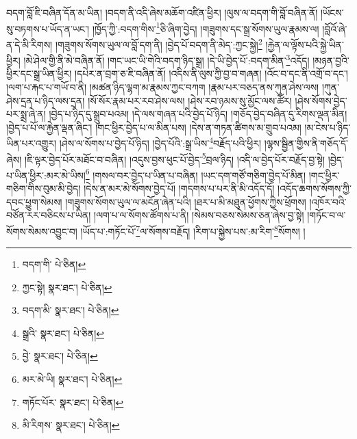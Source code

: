 བདག་བློ་ཇི་བཞིན་དོན་མ་ཡིན། །བདག་ནི་འདི་ཞེས་མཆོག་འཛིན་ཕྱིར། །ལུས་ལ་བདག་གི་བློ་བཞིན་ནོ། །ཡོངས་སུ་བཏགས་པ་ཡོད་ན་ཡང་། །ཁྱོད་ཀྱི་:བདག་གིས་\footnote{བདག་གི་  པེ་ཅིན། }ཅི་ཞིག་བྱེད། །གཟུགས་དང་སྒྲ་སོགས་ཡུལ་རྣམས་ལ། །བློའོ་ཞེ་ན་དེ་མི་རིགས། །གཟུགས་སོགས་ཡུལ་ལ་བློ་དག་ནི། །བྱེད་པོ་བདག་ནི་མེད་:ཀྱང་སྐྱེ།\footnote{ཀྱང་སྟེ།  སྣར་ཐང་།  པེ་ཅིན། } །རྐྱེན་ལ་ལྟོས་པའི་སྐྱེ་ཡིན་ཕྱིར། །མེ་ཤེལ་གྱི་ནི་མེ་བཞིན་ནོ། །གང་ཡང་ཡི་གེའི་བདག་ཉིད་སྒྲ། །དེ་ཡི་བྱེད་པོ་:བདག་མིན་\footnote{བདག་མི་  སྣར་ཐང་།  པེ་ཅིན། }འདོད། །མཉན་བྱའི་ཕྱིར་དང་སྒྲ་ཡིན་ཕྱིར། །དཔེར་ན་བྲག་ཅ་ཇི་བཞིན་ནོ། །འདིས་ནི་ལུས་ཀྱི་བྱ་བ་གཞན། །འོང་བ་དང་ནི་འགྲོ་བ་དང་། །ལག་པ་རྐང་པ་གཡོ་བ་ནི། །མཚན་ཉིད་ལྷག་མ་རྣམས་ཀྱང་བཀག །རྣམ་པར་བཅད་ནས་ཀུན་ཤེས་ལས། །ཀུན་ཤེས་དྲན་པ་ཉིད་ལས་དྲན། །སོ་སོར་རྣམ་པར་རབ་ཤེས་ལས། །ཤེས་རབ་ཉམས་སུ་མྱོང་ལས་ཚོར། །ཤེས་སོགས་བྱེད་པར་སྨྲ་ཞེ་ན། །བྱེད་པ་ཉིད་དུ་སྒྲུབ་པའམ། །དེ་ལས་གཞན་པའི་བྱེད་པོ་ཉིད། །གཅོད་བྱེད་བཞིན་དུ་རིགས་ལྡན་མིན། །བྱེད་པ་པོ་ལ་རྐྱེན་ལྡན་ཞིང་། །གང་ཕྱིར་བྱེད་པ་ལ་མིན་པས། །དེས་ན་གཏན་ཚིགས་མ་གྲུབ་པའམ། །མ་ངེས་པ་ཉིད་ཡིན་པར་འགྱུར། །ཤེས་ལ་སོགས་པ་བྱེད་པོ་ཉིད། །བྱེད་པོའི་:སྒྲ་ཡིས་\footnote{སྒྲའི་  སྣར་ཐང་།  པེ་ཅིན། }བརྗོད་པའི་ཕྱིར། །ལྷས་སྦྱིན་གྱིས་ནི་གཅོད་དོ་ཞེས། །ཇི་ལྟར་བྱེད་པོར་མཐོང་བ་བཞིན། །འདུས་བྱས་ཕུང་པོ་བྱེད་\footnote{བྱེ་  སྣར་ཐང་།  པེ་ཅིན། }བྲལ་ཉིད། །འདི་ལ་བྱེད་པོར་བརྗོད་བྱ་སྟེ། །བྱེད་པ་ཡིན་ཕྱིར་:མར་མེ་ཡིས།\footnote{མར་མེ་ཡི།  སྣར་ཐང་།  པེ་ཅིན། } །གསལ་བར་བྱེད་པ་ཡིན་པ་བཞིན། །ཡང་དག་གཙོ་གཅིག་བྱེད་པོ་མིན། །གང་ཕྱིར་གཅིག་གིས་བུམ་མི་བྱེད། །དེས་ན་མར་མེ་སོགས་བྱེད་པོ། །གདགས་པ་པར་ནི་མི་འདོད་དོ། །འདོད་ཆགས་སོགས་ཀྱི་དབང་ཕྱུག་སེམས། །གཟུགས་སོགས་ཡུལ་ལ་མངོན་ཞེན་པའི། །ཐར་པ་མི་མཐུན་ཕྱོགས་ཀྱིས་ཕྲོགས། །འཁོར་བའི་བཙོན་རར་བཅིངས་པ་ཡིན། །ལག་པ་ལ་སོགས་ཚོགས་པ་ནི། །སེམས་བཅས་སེམས་ཅན་ཞེས་བྱ་སྟེ། །གཏོང་བ་ལ་སོགས་སེམས་འབྱུང་བ། །ཡོད་པ་:གཏོང་པོ་\footnote{གཏོང་པོར་  སྣར་ཐང་།  པེ་ཅིན། }ལ་སོགས་བརྗོད། །རིག་པ་སྐྱེས་པས་:མ་རིག་\footnote{མི་རིགས་  སྣར་ཐང་།  པེ་ཅིན། }སོགས། །

